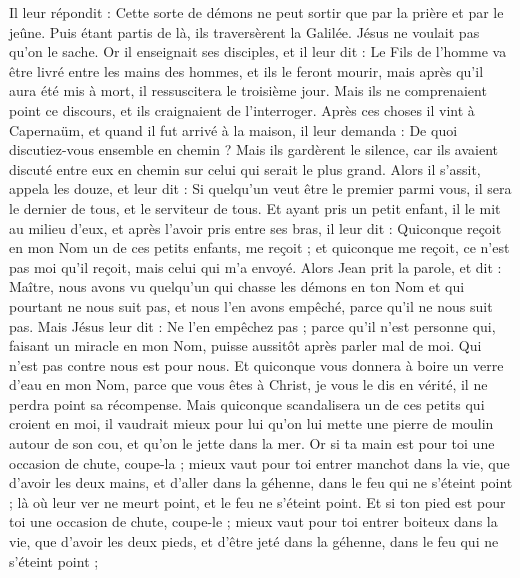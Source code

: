 \begin{multicols}{2}
Il leur répondit : Cette sorte de démons ne peut sortir que par la prière et par le jeûne.
Puis étant partis de là, ils traversèrent la Galilée. Jésus ne voulait pas qu’on le sache.
Or il enseignait ses disciples, et il leur dit : Le Fils de l'homme va être livré entre les mains des hommes, et ils le feront mourir, mais après qu'il aura été mis à mort, il ressuscitera le troisième jour.
Mais ils ne comprenaient point ce discours, et ils craignaient de l'interroger.
Après ces choses il vint à Capernaüm, et quand il fut arrivé à la maison, il leur demanda : De quoi discutiez-vous ensemble en chemin ?
Mais ils gardèrent le silence, car ils avaient discuté entre eux en chemin sur celui qui serait le plus grand.
Alors il s’assit, appela les douze, et leur dit : Si quelqu'un veut être le premier parmi vous, il sera le dernier de tous, et le serviteur de tous.
Et ayant pris un petit enfant, il le mit au milieu d'eux, et après l'avoir pris entre ses bras, il leur dit :
Quiconque reçoit en mon Nom un de ces petits enfants, me reçoit ; et quiconque me reçoit, ce n'est pas moi qu’il reçoit, mais celui qui m'a envoyé.
Alors Jean prit la parole, et dit : Maître, nous avons vu quelqu'un qui chasse les démons en ton Nom et qui pourtant ne nous suit pas, et nous l'en avons empêché, parce qu'il ne nous suit pas.
Mais Jésus leur dit : Ne l'en empêchez pas ; parce qu'il n’est personne qui, faisant un miracle en mon Nom, puisse aussitôt après parler mal de moi.
Qui n'est pas contre nous est pour nous.
Et quiconque vous donnera à boire un verre d'eau en mon Nom, parce que vous êtes à Christ, je vous le dis en vérité, il ne perdra point sa récompense.
Mais quiconque scandalisera un de ces petits qui croient en moi, il vaudrait mieux pour lui qu'on lui mette une pierre de moulin autour de son cou, et qu'on le jette dans la mer.
Or si ta main est pour toi une occasion de chute, coupe-la ; mieux vaut pour toi entrer manchot dans la vie, que d'avoir les deux mains, et d’aller dans la géhenne, dans le feu qui ne s'éteint point ;
là où leur ver ne meurt point, et le feu ne s'éteint point.
Et si ton pied est pour toi une occasion de chute, coupe-le ; mieux vaut pour toi entrer boiteux dans la vie, que d'avoir les deux pieds, et d’être jeté dans la géhenne, dans le feu qui ne s'éteint point ;

\end{multicols}

